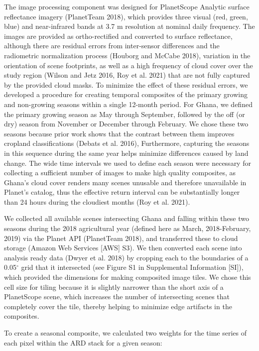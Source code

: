\documentclass[11pt,a4paper]{article}
\begin{document}
The image processing component was designed for PlanetScope Analytic
surface reflectance imagery (PlanetTeam 2018), which provides three
visual (red, green, blue) and near-infrared bands at 3.7 m resolution at
nominal daily frequency. The images are provided as ortho-rectified and
converted to surface reflectance, although there are residual errors
from inter-sensor differences and the radiometric normalization process
(Houborg and McCabe 2018), variation in the orientation of scene
footprints, as well as a high frequency of cloud cover over the study
region (Wilson and Jetz 2016, Roy et al. 2021) that are not fully
captured by the provided cloud masks. To minimize the effect of these
residual errors, we developed a procedure for creating temporal
composites of the primary growing and non-growing seasons within a
single 12-month period. For Ghana, we defined the primary growing season
as May through September, followed by the off (or dry) season from
November or December through February. We chose these two seasons
because prior work shows that the contrast between them improves
cropland classifications (Debats et al. 2016), Furthermore, capturing
the seasons in this sequence during the same year helps minimize
differences caused by land change. The wide time intervals we used to
define each season were necessary for collecting a sufficient number of
images to make high quality composites, as Ghana's cloud cover renders
many scenes unusable and therefore unavailable in Planet's catalog, thus
the effective return interval can be substantially longer than 24 hours
during the cloudiest months (Roy et al. 2021).

We collected all available scenes intersecting Ghana and falling within
these two seasons during the 2018 agricultural year (defined here as
March, 2018-February, 2019) via the Planet API (PlanetTeam 2018), and
transferred these to cloud storage (Amazon Web Services {[}AWS{]} S3).
We then converted each scene into analysis ready data (Dwyer et al.
2018) by cropping each to the boundaries of a 0.05\(^\circ\) grid that
it intersected (see Figure S1 in Supplemental Information {[}SI{]}),
which provided the dimensions for making composited image tiles. We
chose this cell size for tiling because it is slightly narrower than the
short axis of a PlanetScope scene, which increases the number of
intersecting scenes that completely cover the tile, thereby helping to
minimize edge artifacts in the composites.

To create a seasonal composite, we calculated two weights for the time
series of each pixel within the ARD stack for a given season:
\end{document}
